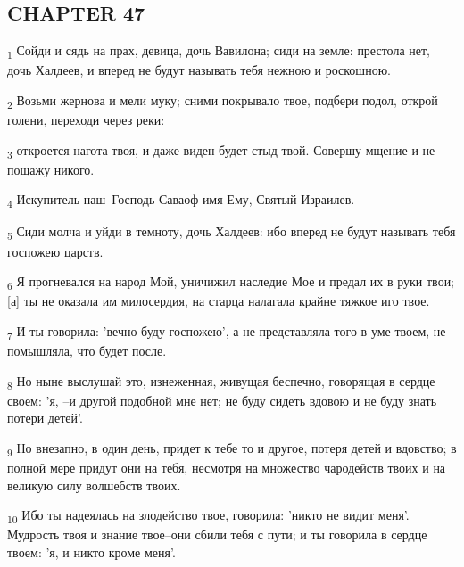 \subsection{CHAPTER 47}
\begin{tcolorbox}
\textsubscript{1} Сойди и сядь на прах, девица, дочь Вавилона; сиди на земле: престола нет, дочь Халдеев, и вперед не будут называть тебя нежною и роскошною.
\end{tcolorbox}
\begin{tcolorbox}
\textsubscript{2} Возьми жернова и мели муку; сними покрывало твое, подбери подол, открой голени, переходи через реки:
\end{tcolorbox}
\begin{tcolorbox}
\textsubscript{3} откроется нагота твоя, и даже виден будет стыд твой. Совершу мщение и не пощажу никого.
\end{tcolorbox}
\begin{tcolorbox}
\textsubscript{4} Искупитель наш--Господь Саваоф имя Ему, Святый Израилев.
\end{tcolorbox}
\begin{tcolorbox}
\textsubscript{5} Сиди молча и уйди в темноту, дочь Халдеев: ибо вперед не будут называть тебя госпожею царств.
\end{tcolorbox}
\begin{tcolorbox}
\textsubscript{6} Я прогневался на народ Мой, уничижил наследие Мое и предал их в руки твои; [а] ты не оказала им милосердия, на старца налагала крайне тяжкое иго твое.
\end{tcolorbox}
\begin{tcolorbox}
\textsubscript{7} И ты говорила: 'вечно буду госпожею', а не представляла того в уме твоем, не помышляла, что будет после.
\end{tcolorbox}
\begin{tcolorbox}
\textsubscript{8} Но ныне выслушай это, изнеженная, живущая беспечно, говорящая в сердце своем: 'я, --и другой подобной мне нет; не буду сидеть вдовою и не буду знать потери детей'.
\end{tcolorbox}
\begin{tcolorbox}
\textsubscript{9} Но внезапно, в один день, придет к тебе то и другое, потеря детей и вдовство; в полной мере придут они на тебя, несмотря на множество чародейств твоих и на великую силу волшебств твоих.
\end{tcolorbox}
\begin{tcolorbox}
\textsubscript{10} Ибо ты надеялась на злодейство твое, говорила: 'никто не видит меня'. Мудрость твоя и знание твое--они сбили тебя с пути; и ты говорила в сердце твоем: 'я, и никто кроме меня'.
\end{tcolorbox}
